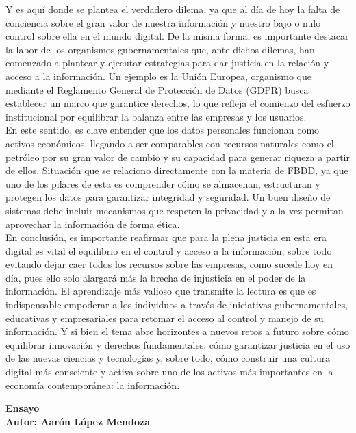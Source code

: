 \documentclass[12pt]{report}
\begin{document}
\begin{enumerate}[label=\textbf{\arabic*.}, leftmargin=*]
\begin{enumerate}[label=\textbf{\alph*.}, leftmargin=*, itemsep=1.0em]
Y es aquí donde se plantea el verdadero dilema, ya que al día de hoy la falta de conciencia sobre el gran valor de nuestra información y nuestro bajo o nulo control sobre ella en el mundo digital. De la misma forma, es importante destacar la labor de los organismos gubernamentales que, ante dichos dilemas, han comenzado a plantear y ejecutar estrategias para dar justicia en la relación y acceso a la información. Un ejemplo es la Unión Europea, organismo que mediante el Reglamento General de Protección de Datos (GDPR) busca establecer un marco que garantice derechos, lo que refleja el comienzo del esfuerzo institucional por equilibrar la balanza entre las empresas y los usuarios.\\

En este sentido, es clave entender que los datos personales funcionan como activos económicos, llegando a ser comparables con recursos naturales como el petróleo por su gran valor de cambio y su capacidad para generar riqueza a partir de ellos. Situación que se relaciono directamente con la materia de FBDD, ya que uno de los pilares de esta es comprender cómo se almacenan, estructuran y protegen los datos para garantizar integridad y seguridad. Un buen diseño de sistemas debe incluir mecanismos que respeten la privacidad y a la vez permitan aprovechar la información de forma ética.\\

En conclusión, es importante reafirmar que para la plena justicia en esta era digital es vital el equilibrio en el control y acceso a la información, sobre todo evitando dejar caer todos los recursos sobre las empresas, como sucede hoy en día, pues ello solo alargará más la brecha de injusticia en el poder de la información. El aprendizaje más valioso que transmite la lectura es que es indispensable empoderar a los individuos a través de iniciativas gubernamentales, educativas y empresariales para retomar el acceso al control y manejo de su información. Y si bien el tema abre horizontes a nuevos retos a futuro sobre cómo equilibrar innovación y derechos fundamentales, cómo garantizar justicia en el uso de las nuevas ciencias y tecnologías y, sobre todo, cómo construir una cultura digital más consciente y activa sobre uno de los activos más importantes en la economía contemporánea: la información.



\newpage
\textbf{Ensayo\\
        Autor: Aar\'on L\'opez Mendoza}



\end{enumerate}
\end{enumerate}
\end{document}
